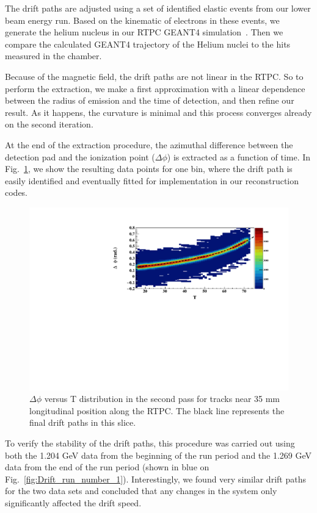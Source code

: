 \documentclass[preprint,5p]{elsarticle}
\begin{document}
The drift paths are adjusted using a set of identified elastic events from our 
lower beam energy run. Based on the kinematic of electrons in these events, 
we generate the helium nucleus in our RTPC GEANT4 simulation~\cite{GEANT4}. Then 
we compare the calculated GEANT4 trajectory of the Helium nuclei to 
the hits measured in the chamber. 

Because of the magnetic field, the drift paths are not linear in the RTPC. So 
to perform the extraction, we make a first approximation with a linear 
dependence between the radius of emission and the time of detection, and then 
refine our result. As it happens, the curvature is minimal and this process 
converges already on the second iteration. 

At the end of the extraction procedure, the azimuthal difference between the detection pad and 
the ionization point ($\Delta\phi$) is extracted as a function of time. 
In Fig.~\ref{fig:DELTA_PHI_TDC}, we show the resulting data points for one 
bin, where the drift path is easily identified and eventually fitted for 
implementation in our reconstruction codes.

\begin{figure}[tb]
\centering
\includegraphics[scale=0.42]{fig_2017/FitResult_p2_11.pdf}
\caption{$\Delta \phi$ versus T distribution in the second pass for tracks
near 35 mm longitudinal position along the RTPC. The black line represents 
the final drift paths in this slice.}
\label{fig:DELTA_PHI_TDC}
\end{figure}

To verify the stability of the drift paths, this procedure was carried out 
using both the 1.204 GeV data from the beginning of the run period and the 
1.269 GeV data from the end of the run period (shown in blue on 
Fig.~\ref{fig:Drift_run_number_1}). Interestingly, we found very similar drift paths
for the two data sets and concluded that any changes in the system only
significantly affected the drift speed.
\end{document}
